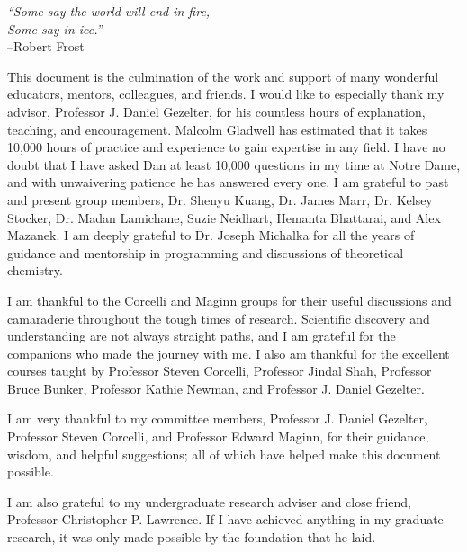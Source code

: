 \documentclass[noinfo,final,sort&compress]{nddiss2e}
\begin{document}

\tableofcontents
\listoffigures
\listoftables

\begin{preface}
\vfill
\begin{flushright}
\textit{``Some say the world will end in fire,} \\
\textit{Some say in ice.''}\\
--Robert Frost
\end{flushright}
\vfill
\end{preface}

\begin{acknowledge}
  This document is the culmination of the work and support of many
  wonderful educators, mentors, colleagues, and friends. I would like
  to especially thank my advisor, Professor J. Daniel Gezelter, for
  his countless hours of explanation, teaching, and
  encouragement. Malcolm Gladwell has estimated that it takes 10,000
  hours of practice and experience to gain expertise in any field. I
  have no doubt that I have asked Dan at least 10,000 questions in my
  time at Notre Dame, and with unwaivering patience he has answered
  every one. I am grateful to past and present group members,
  Dr. Shenyu Kuang, Dr. James Marr, Dr. Kelsey Stocker, Dr. Madan
  Lamichane, Suzie Neidhart, Hemanta Bhattarai, and Alex Mazanek. I am
  deeply grateful to Dr. Joseph Michalka for all the years of guidance
  and mentorship in programming and discussions of theoretical
  chemistry.

  I am thankful to the Corcelli and Maginn groups for their useful
  discussions and camaraderie throughout the tough times of
  research. Scientific discovery and understanding are not always
  straight paths, and I am grateful for the companions who made the
  journey with me. I also am thankful for the excellent courses taught by
  Professor Steven Corcelli, Professor Jindal Shah, Professor Bruce
  Bunker, Professor Kathie Newman, and Professor J. Daniel Gezelter.

  I am very thankful to my committee members, Professor J. Daniel
  Gezelter, Professor Steven Corcelli, and Professor Edward Maginn,
  for their guidance, wisdom, and helpful suggestions; all of which
  have helped make this document possible.

  I am also grateful to my undergraduate research adviser and close
  friend, Professor Christopher P. Lawrence. If I have achieved
  anything in my graduate research, it was only made possible by the
  foundation that he laid.


\end{acknowledge}
\end{document}
